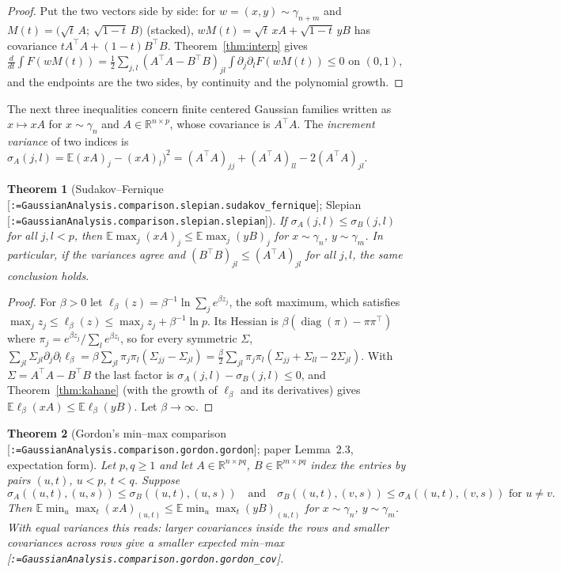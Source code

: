 \documentclass[11pt]{article}
\makeatletter
\newcommand{\formal@break}[1]{\@tfor\formal@tok:=#1\do{%
  \formal@tok
  \expandafter\ifx\formal@tok.\allowbreak\else
  \expandafter\ifx\formal@tok\_\allowbreak\fi\fi}}
\DeclareRobustCommand{\formal}[1]{\textnormal{[\texttt{\small\formal@break{#1}}]}}
\newcommand{\R}{\mathbb{R}}
\newcommand{\E}{\mathbb{E}}
\newcommand{\gauss}{\gamma}
\newcommand{\diag}{\operatorname{diag}}
\theoremstyle{plain}
\newtheorem{theorem}{Theorem}[section]
\theoremstyle{definition}
\makeatother
\begin{document}
\begin{proof}
Put the two vectors side by side: for $w = (x, y) \sim \gauss_{n+m}$ and
$M(t) = \bigl(\sqrt{t}\, A;\ \sqrt{1-t}\, B\bigr)$ (stacked), $wM(t) = \sqrt t\, xA + \sqrt{1-t}\, yB$
has covariance $tA^{\top}A + (1-t)B^{\top}B$. Theorem~\ref{thm:interp}
gives $\frac{d}{dt} \int F(wM(t)) = \frac12 \sum_{j,l} (A^{\top}A - B^{\top}B)_{jl} \int \partial_j\partial_l F(wM(t)) \le 0$
on $(0,1)$, and the endpoints are the two sides, by continuity and the
polynomial growth.
\end{proof}

The next three inequalities concern finite centered Gaussian families
written as $x \mapsto xA$ for $x \sim \gauss_n$ and $A \in \R^{n \times p}$,
whose covariance is $A^{\top} A$. The \emph{increment variance} of two
indices is $\sigma_A(j, l) = \E (xA)_j - (xA)_l)^2 = (A^{\top}A)_{jj} + (A^{\top}A)_{ll} - 2(A^{\top}A)_{jl}$.

\begin{theorem}[Sudakov--Fernique \formal{GaussianAnalysis.comparison.slepian.sudakov\_fernique}; Slepian \formal{GaussianAnalysis.comparison.slepian.slepian}]\label{thm:sf}
If $\sigma_A(j, l) \le \sigma_B(j, l)$ for all $j, l < p$, then
$\E \max_j (xA)_j \le \E \max_j (yB)_j$ for $x \sim \gauss_n$, $y \sim \gauss_m$.
In particular, if the variances agree and $(B^{\top} B)_{jl} \le (A^{\top} A)_{jl}$
for all $j, l$, the same conclusion holds.
\end{theorem}

\begin{proof}
For $\beta > 0$ let $\ell_\beta(z) = \beta^{-1} \ln \sum_j e^{\beta z_j}$, the
soft maximum, which satisfies $\max_j z_j \le \ell_\beta(z) \le \max_j z_j + \beta^{-1}\ln p$.
Its Hessian is $\beta(\diag(\pi) - \pi \pi^{\top})$ where
$\pi_j = e^{\beta z_j}/\sum_l e^{\beta z_l}$, so for every symmetric
$\Sigma$, $\sum_{jl} \Sigma_{jl} \partial_j\partial_l \ell_\beta = \beta \sum_{jl} \pi_j \pi_l (\Sigma_{jj} - \Sigma_{jl}) = \frac{\beta}{2} \sum_{jl} \pi_j\pi_l (\Sigma_{jj} + \Sigma_{ll} - 2\Sigma_{jl})$.
With $\Sigma = A^{\top}A - B^{\top}B$ the last factor is
$\sigma_A(j,l) - \sigma_B(j,l) \le 0$, and Theorem~\ref{thm:kahane}
(with the growth of $\ell_\beta$ and its derivatives) gives
$\E \ell_\beta(xA) \le \E \ell_\beta(yB)$. Let $\beta \to \infty$.
\end{proof}

\begin{theorem}[Gordon's min--max comparison \formal{GaussianAnalysis.comparison.gordon.gordon}; paper Lemma~2.3, expectation form]\label{thm:gordon}
Let $p, q \ge 1$ and let $A \in \R^{n \times pq}$, $B \in \R^{m\times pq}$
index the entries by pairs $(u, t)$, $u < p$, $t < q$. Suppose
\[
\sigma_A((u,t),(u,s)) \le \sigma_B((u,t),(u,s)) \quad\text{and}\quad
\sigma_B((u,t),(v,s)) \le \sigma_A((u,t),(v,s)) \text{ for } u \ne v .
\]
Then $\E \min_u \max_t (xA)_{(u,t)} \le \E \min_u \max_t (yB)_{(u,t)}$
for $x \sim \gauss_n$, $y \sim \gauss_m$. With equal variances this reads:
larger covariances inside the rows and smaller covariances across rows
give a smaller expected min--max \formal{GaussianAnalysis.comparison.gordon.gordon\_cov}.
\end{theorem}
\end{document}
